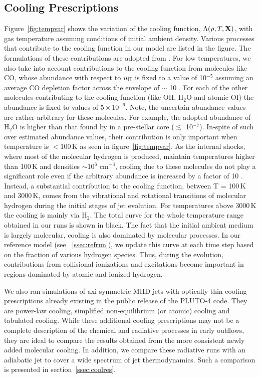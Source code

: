 \documentclass[useAMS,usenatbib]{mn2e}
\begin{document}
\subsection{Cooling Prescriptions}
%
Figure~\ref{fig:tempvar} shows the variation
of the cooling function, $\Lambda(\rho,T,{\bf{X}})$, with gas
temperature assuming conditions of initial ambient density. 
Various processes that contribute to the cooling function in our model
are listed in the figure. The formulations of these contributions
are adopted from \citep[][and references therein]{Smith:2003p9985, OSullivan:2009p10078}.
For low temperatures, we also 
take into account contributions to the cooling function from molecules like
CO, whose abundance with respect to $n_{\rm H}$ is fixed to a
value of 10$^{-5}$ assuming an average CO depletion factor across the
envelope of $\sim$ 10 \citep[e.g.][]{Crapsi:2005p16655}. 
For each of the other molecules contributing to the cooling function (like OH, H$_{2}$O and atomic OI)
the abundance is fixed to values of $5\times10^{-6}$. Note, the
uncertain abundance values are rather arbitrary for these molecules. 
For example, the adopted abundance of H$_{2}$O is higher than that found by
\citealt{Caselli:2012p16713} in a pre-stellar core ($\lesssim$
10$^{-7}$). In-spite of such over estimated abundance values, their
contribution is only important when temperature is $<$100\,K as seen in
figure~\ref{fig:tempvar}. As the internal shocks, where most
of the molecular hydrogen is produced, maintain temperatures higher
than 100\,K and densities $\sim$10$^{6}$ cm$^{-3}$, cooling due to these molecules do not
play a significant role even if the arbitrary abundance is increased
by a factor of 10 \citep{Smith:2003p9985}. Instead, a substantial contribution to the cooling
function, between T = 100\,K and 3000\,K, 
comes from the vibrational and rotational transitions of
molecular hydrogen during the initial stages of jet
evolution. For temperatures above 3000\,K the
cooling is mainly via H$_{2}$. The total curve for the
whole temperature range obtained in our runs is shown in black.
The fact that the initial ambient medium is largely molecular, cooling is also dominated by
molecular processes. In our reference model (see ~\ref{ssec:refrun}), 
we update this curve at each time step based on the fraction of
various hydrogen species. Thus, during the evolution, 
contributions from collisional ionizations and excitations become
important in regions dominated by atomic and ionized hydrogen.

We also ran simulations of axi-symmetric MHD jets
with optically thin cooling prescriptions already existing in the public
release of the PLUTO-4 code. They are power-law cooling, 
simplified non-equilibrium (or atomic) cooling \citep{Tesileanu:2008p429} and tabulated
cooling. While these additional cooling prescriptions may not be a complete description of
the chemical and radiative processes in early outflows, they are ideal
to compare the results obtained from the more consistent newly added molecular
cooling. In addition, we compare these radiative runs with an adiabatic jet 
to cover a wide spectrum of jet thermodynamics. 
Such a comparison is presented in section~\ref{ssec:coolres}.
\end{document}
